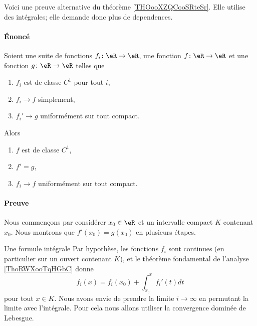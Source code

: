 \begin{normaltext}      \label{NORMALooGYUEooKrYjyz}
    Voici une preuve alternative du théorème \ref{THOooXZQCooSRteSr}. Elle utilise des intégrales; elle demande donc plus de dependences.

    \paragraph{Énoncé}
    Soient une suite de fonctions \( f_i\colon \eR\to \eR\), une fonction \( f\colon \eR\to \eR\) et une fonction \( g\colon \eR\to \eR\) telles que
    \begin{enumerate}
        \item
            \( f_i\) est de classe \( C^1\) pour tout \( i\),
        \item
            \( f_i\to f\) simplement,
        \item
            \( f_i'\to g\) uniformément sur tout compact.
    \end{enumerate}
    Alors
    \begin{enumerate}
        \item
            \( f\) est de classe \( C^1\),
        \item
            \( f'=g\),
        \item
            \( f_i\to f\) uniformément sur tout compact.
    \end{enumerate}
    \paragraph{Preuve}

        Nous commençons par considérer \( x_0\in \eR\) et un intervalle compact \( K\) contenant \( x_0\). Nous montrons que \( f'(x_0)=g(x_0)\) en plusieurs étapes.
        \begin{subproof}
        \item[Une formule intégrale]
        Par hypothèse, les fonctions \( f_i\) sont continues (en particulier sur un ouvert contenant \( K\)), et le théorème fondamental de l'analyse \ref{ThoRWXooTqHGbC} donne
        \begin{equation}        \label{EQooFUBZooOVUhep}
            f_i(x)=f_i(x_0)+\int_{x_0}^xf_i'(t)dt
        \end{equation}
        pour tout \( x\in K\). Nous avons envie de prendre la limite \( i\to \infty\) en permutant la limite avec l'intégrale. Pour cela nous allons utiliser la convergence dominée de Lebesgue.


\end{subproof}
\end{normaltext}
